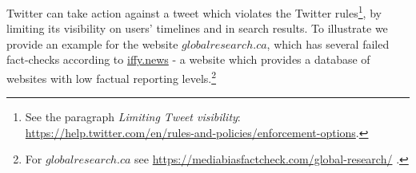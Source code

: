 \documentclass[11pt,a4paper]{article}
\begin{document}
Twitter can take action against a tweet which violates the Twitter rules\footnote{See the paragraph {\it Limiting Tweet visibility}: \href{https://help.twitter.com/en/rules-and-policies/enforcement-options}{https://help.twitter.com/en/rules-and-policies/enforcement-options}.}, by limiting its visibility on users' timelines and in search results. To illustrate we provide an example for the website $globalresearch.ca$, which has several failed fact-checks according to \href{https://iffy.news}{iffy.news} - a website which provides a database of websites with low factual reporting levels.\footnote{For $globalresearch.ca$ see \href{https://mediabiasfactcheck.com/global-research/}{https://mediabiasfactcheck.com/global-research/} .  }

\smallskip

\end{document}
